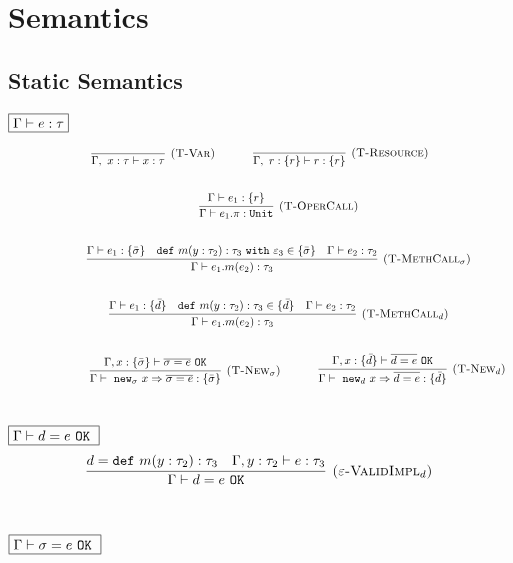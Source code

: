 \documentclass{llncs}
\newcommand{\keywadj}[1]{\mathtt{#1}}
\newcommand{\keyw}[1]{\keywadj{#1}~}
\begin{document}
\section{Semantics}

\subsection{Static Semantics}

\noindent
$\fbox{$\Gamma \vdash e : \tau$}$

\[
\begin{array}{c}
\infer[\textsc{(T-Var)}]
	{\Gamma,~x : \tau \vdash x : \tau}
	{}
~~~~~~~~~~
\infer[\textsc{(T-Resource)}]
	{\Gamma,~r : \{ r \} \vdash r : \{ r \}}
	{} \\[5ex]
~~~~~~~~~~
\infer[\textsc{(T-OperCall)}]
	{\Gamma \vdash e_1.\pi : \keywadj{Unit}}
	{\Gamma \vdash e_1 : \{ r \}} \\[5ex]
~~~~~~~~~~
\infer[\textsc{(T-MethCall$_\sigma$)}]
	{\Gamma \vdash e_1.m(e_2) : \tau_3}
	{\Gamma \vdash e_1 : \{ \bar \sigma \} & \keyw{def} m(y : \tau_2) : \tau_3~\keyw{with} \varepsilon_3 \in \{ \bar \sigma \} &  \Gamma \vdash e_2 : \tau_2 }\\[5ex]
~~~~~~~~~~
\infer[\textsc{(T-MethCall$_d$)}]
	{\Gamma \vdash e_1.m(e_2) : \tau_3}
	{\Gamma \vdash e_1 : \{ \bar d\} & \keyw{def} m(y : \tau_2) : \tau_3 \in \{ \bar d \} &  \Gamma \vdash e_2 : \tau_2 }\\[5ex]
~~~~~~~~~~

~~~~~~~~~~
\infer[\textsc{(T-New$_\sigma$)}]
	{\Gamma \vdash~\keywadj{new}_\sigma~x \Rightarrow \overline{\sigma = e} : \{ \bar \sigma \}}
	{\Gamma, x : \{ \bar \sigma \} \vdash \overline{\sigma = e}~\keywadj{OK}}
~~~~~~~~~~
\infer[\textsc{(T-New$_d$)}]
	{\Gamma \vdash~\keywadj{new}_d~x \Rightarrow \overline{d = e} : \{ \bar d \}}
	{\Gamma, x : \{ \bar d \} \vdash \overline{d = e}~\keywadj{OK}}\\[5ex]
\end{array}
\]

\noindent
$\fbox{$\Gamma \vdash d = e~\keyw{OK}$}$
\[
\begin{array}{c}
\infer[\textsc{($\varepsilon$-ValidImpl$_d$)}]
	{\Gamma \vdash d = e~\keywadj{OK}}
	{d = \keyw{def} m(y : \tau_2) : \tau_3 & \Gamma, y : \tau_2 \vdash e : \tau_3}
	\\[5ex]
\end{array}
\]

\noindent
$\fbox{$\Gamma \vdash \sigma = e~\keyw{OK}$}$
\end{document}
